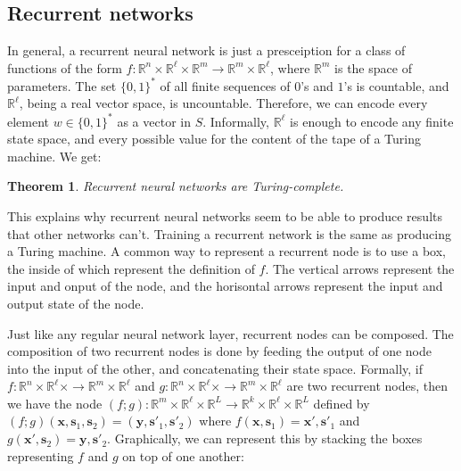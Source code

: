 \documentclass[10pt]{amsart}
\newcommand{\R}{\mathbb{R}}
\newcommand{\x}{\mathbf{x}}
\newcommand{\y}{\mathbf{y}}
\newcommand{\s}{\mathbf{s}}
\newtheorem{theorem}{Theorem}[section]
\theoremstyle{definition}
\begin{document}
\subsection{Recurrent networks}

In general, a recurrent neural network is just a presceiption for a class of functions of the form $f:\R^n\times \R^\ell\times\R^m\to \R^m\times \R^\ell$, where $\R^m$ is the space of parameters. The set $\{0,1\}^*$ of all finite sequences of $0$'s and $1$'s is countable, and $\R^\ell$, being a real vector space,
is uncountable.  Therefore, we can encode every element $w\in\{0,1\}^*$ as a vector in $S$.  Informally,
$\R^\ell$ is enough to encode any finite state space, and every possible value for the content of the tape of a
Turing machine. We get:

\begin{theorem}
Recurrent neural networks are Turing-complete.
\end{theorem}

This explains why recurrent neural networks seem to be able to produce results that other networks can't. Training a recurrent network is the same as producing a Turing machine.  A common way to represent a recurrent node is to use a box, the inside of which represent the definition of $f$.  The vertical arrows represent the input and onput of the node, and the horisontal arrows represent the input and output state of the node.

\begin{center}
\end{center}

Just like any regular neural network layer, recurrent nodes can be composed.  The composition of two recurrent nodes is done by feeding the output of one node into the input of the other, and concatenating their state space.  Formally, if $f:\R^n\times \R^\ell\times\to \R^m\times \R^\ell$ and $g:\R^n\times \R^\ell\times\to \R^m\times \R^\ell$ are two recurrent nodes, then we have the node $(f;g):\R^m\times\R^\ell\times\R^L\to\R^k\times\R^\ell\times\R^L$ defined by $(f;g)(\x, \s_1, \s_2) = (\y, \s'_1, \s'_2)$ where $f(\x, \s_1) = \x', \s'_1$ and $g(\x', \s_2) = \y, \s'_2$. Graphically, we can represent this by stacking the boxes representing $f$ and $g$ on top of one another:
\end{document}
